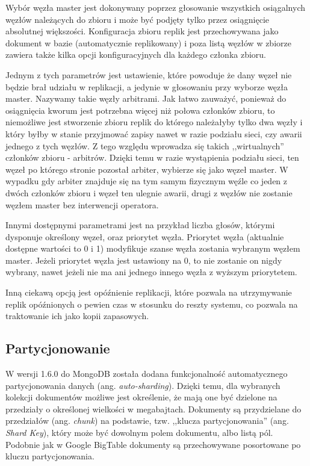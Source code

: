 Wybór węzła master jest dokonywany poprzez głosowanie wszystkich osiągalnych węzłów należących do zbioru i może być podjęty tylko przez osiągnięcie absolutnej większości.
Konfiguracja zbioru replik jest przechowywana jako dokument w bazie (automatycznie replikowany) i poza listą węzłów w zbiorze zawiera także kilka opcji konfiguracyjnych dla każdego członka zbioru.

Jednym z tych parametrów jest ustawienie, które powoduje że dany węzeł nie będzie brał udziału w replikacji, a jedynie w głosowaniu przy wyborze węzła master.
Nazywamy takie węzły arbitrami.
Jak łatwo zauważyć, ponieważ do osiągnięcia kworum jest potrzebna więcej niż połowa członków zbioru, to niemożliwe jest stworzenie zbioru replik do którego należałyby tylko dwa węzły i który byłby w stanie przyjmować zapisy nawet w razie podziału sieci, czy awarii jednego z tych węzłów.
Z tego względu wprowadza się takich ,,wirtualnych'' członków zbioru - arbitrów.
Dzięki temu w razie wystąpienia podziału sieci, ten węzeł po którego stronie pozostał arbiter, wybierze się jako węzeł master.
W wypadku gdy arbiter znajduje się na tym samym fizycznym węźle co jeden z dwóch członków zbioru i węzeł ten ulegnie awarii, drugi z węzłów nie zostanie węzłem master bez interwencji operatora.

Innymi dostępnymi parametrami jest na przykład liczba głosów, którymi dysponuje określony węzeł, oraz priorytet węzła.
Priorytet węzła (aktualnie dostępne wartości to 0 i 1) modyfikuje szanse węzła zostania wybranym węzłem master.
Jeżeli priorytet węzła jest ustawiony na 0, to nie zostanie on nigdy wybrany, nawet jeżeli nie ma ani jednego innego węzła z wyższym priorytetem.

Inną ciekawą opcją jest opóźnienie replikacji, które pozwala na utrzymywanie replik opóźnionych o pewien czas w stosunku do reszty systemu, co pozwala na traktowanie ich jako kopii zapasowych.

\subsection*{Partycjonowanie}


W wersji 1.6.0 do MongoDB została dodana funkcjonalność automatycznego partycjonowania danych (ang. \emph{auto-sharding}).
Dzięki temu, dla wybranych kolekcji dokumentów możliwe jest określenie, że mają one być dzielone na przedziały o określonej wielkości w megabajtach.
Dokumenty są przydzielane do przedziałów (ang. \emph{chunk}) na podstawie, tzw. ,,klucza partycjonowania'' (ang. \emph{Shard Key}), który może być dowolnym polem dokumentu, albo listą pól.
Podobnie jak w Google BigTable dokumenty są przechowywane posortowane po kluczu partycjonowania.

